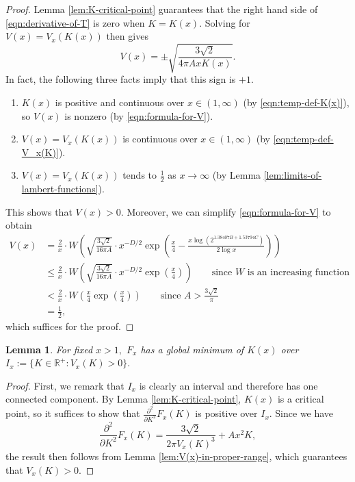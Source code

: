 \documentclass[11pt,letterpaper,reqno]{amsart}
\newtheorem{lemma}[theorem]{Lemma}
\theoremstyle{definition}
\numberwithin{equation}{section}
\numberwithin{figure}{section}
\numberwithin{table}{section}
\begin{document}
\begin{proof}
    Lemma \ref{lem:K-critical-point} guarantees that the right hand side of \eqref{eqn:derivative-of-T} is zero when $K = K(x)$. Solving for $V(x) = V_x(K(x))$ then gives
        \begin{equation}
            V(x) = \pm \sqrt{\frac{3\sqrt{2}}{4\pi Ax K(x)}}. \label{eqn:formula-for-V}
        \end{equation}
        In fact, the following three facts imply that this sign is $+1$.
        \begin{enumerate}
            \item $K(x)$ is positive and continuous over $x \in (1,\infty)$ (by \eqref{eqn:temp-def-K(x)}), so $V(x)$ is nonzero (by \eqref{eqn:formula-for-V}).
            \item $V(x) = V_x(K(x))$ is continuous over $x \in (1,\infty)$ (by \eqref{eqn:temp-def-V_x(K)}).
            \item $V(x)= V_x(K(x))$ tends to $\frac{1}{2}$ as $x \to \infty$ (by Lemma \ref{lem:limits-of-lambert-functions}).
        \end{enumerate}
        This shows that $V(x) > 0.$ Moreover, we can simplify \eqref{eqn:formula-for-V} to obtain
        \begin{align}
            V(x) &= \frac{2}{x} \cdot  W\left( \sqrt{\frac{3\sqrt{2}}{16 \pi A}} \cdot x^{-D/2} \exp\left( \frac{x}{4} - \frac{x \log\left( 2^{1.38407B +  1.53794C}  \right)}{2\log x}  \right) \right) \\
            &\leq \frac{2}{x} \cdot  W\left( \sqrt{\frac{3\sqrt{2}}{16 \pi A}} \cdot x^{-D/2} \exp\left( \frac{x}{4}
            \right) \right) \qquad \text{since $W$ is an increasing function }\\
            &< \frac{2}{x} \cdot W\left( \frac{x}{4} \exp\left( \frac{x}{4}
            \right)\right)  \qquad \text{since $A > \frac{3\sqrt{2}}{\pi}$} \\
            &= \frac{1}{2},
        \end{align}
        which suffices for the proof.
\end{proof}

\begin{lemma}\label{lem:K-global-minimum}
    For fixed $x > 1,$ $F_x$ has a global minimum of $K(x)$ over $I_x := \{K \in \mathbb{R}^+ : V_x(K) > 0 \}.$
\end{lemma}

\begin{proof}
    First, we remark that $I_x$ is clearly an interval and therefore has one connected component. By Lemma \ref{lem:K-critical-point}, $K(x)$ is a critical point, so it suffices to show that $\frac{\partial^2}{\partial K^2} F_x(K)$ is positive over $I_x.$ Since we have
    $$\frac{\partial^2}{\partial K^2} F_x(K) = \frac{3\sqrt{2}}{2\pi V_x(K)^3} + Ax^2 K,$$
    the result then follows from Lemma \ref{lem:V(x)-in-proper-range}, which guarantees that $V_x(K) > 0.$
\end{proof}
\end{document}
